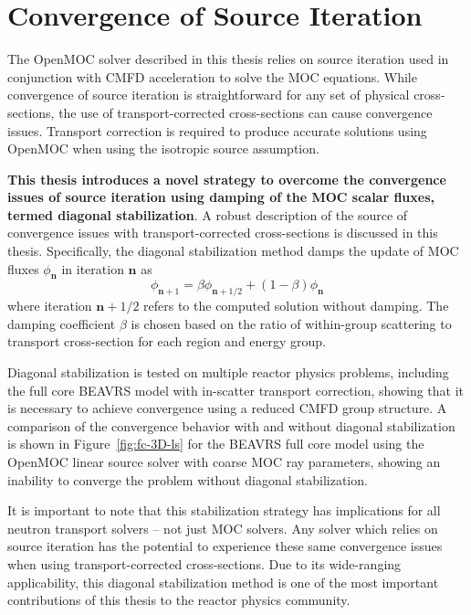 \documentclass[12pt,twoside]{mitthesis-exec}
\begin{document}
\section*{Convergence of Source Iteration}

The OpenMOC solver described in this thesis relies on source iteration used in conjunction with CMFD acceleration to solve the MOC equations. While convergence of source iteration is straightforward for any set of physical cross-sections, the use of transport-corrected cross-sections can cause convergence issues. Transport correction is required to produce accurate solutions using OpenMOC when using the isotropic source assumption.

\textbf{This thesis introduces a novel strategy to overcome the convergence issues of source iteration using damping of the MOC scalar fluxes, termed diagonal stabilization}. A robust description of the source of convergence issues with transport-corrected cross-sections is discussed in this thesis. Specifically, the diagonal stabilization method damps the update of MOC fluxes $\phi_{\mathbf{n}}$ in iteration $\mathbf{n}$ as
\begin{equation}
\nonumber
\phi_{\mathbf{n}+1} = \beta \phi_{\mathbf{n}+1/2} + (1-\beta) \phi_{\mathbf{n}} 
\end{equation}
where iteration $\mathbf{n}+1/2$ refers to the computed solution without damping. The damping coefficient $\beta$ is chosen based on the ratio of within-group scattering to transport cross-section for each region and energy group.

Diagonal stabilization is tested on multiple reactor physics problems, including the full core BEAVRS model with in-scatter transport correction, showing that it is necessary to achieve convergence using a reduced CMFD group structure. A comparison of the convergence behavior with and without diagonal stabilization is shown in Figure~\ref{fig:fc-3D-ls} for the BEAVRS full core model using the OpenMOC linear source solver with coarse MOC ray parameters, showing an inability to converge the problem without diagonal stabilization.

It is important to note that this stabilization strategy has implications for all neutron transport solvers -- not just MOC solvers. Any solver which relies on source iteration has the potential to experience these same convergence issues when using transport-corrected cross-sections. Due to its wide-ranging applicability, this diagonal stabilization method is one of the most important contributions of this thesis to the reactor physics community. 
\end{document}

